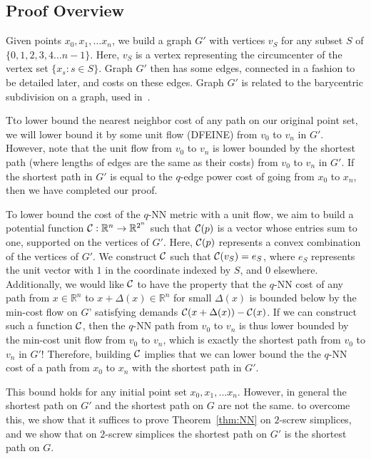 \subsection{Proof Overview}

Given points $x_0, x_1, \ldots x_n$, we build a graph $G'$ with
vertices $v_S$ for any subset $S$ of
$\{0,1,2,3,4 \ldots n-1 \}$. Here, $v_S$ is a vertex representing the
circumcenter of the vertex set $\{x_s: s \in S\}$. Graph $G'$ then has some
edges, connected in a fashion to be detailed later, and costs on these edges.
Graph $G'$ is related to the barycentric subdivision on a graph, used
in~\cite{}.

Tto lower bound the nearest neighbor cost of any path on our original point
set, we will lower bound it by some unit flow (DFEINE) from $v_0$ to $v_n$
in $G'$. However, note that the unit flow from $v_0$ to $v_n$ is lower
bounded by the shortest path (where lengths of edges are the same as their
costs) from $v_0$ to $v_n$ in $G'$. If the shortest path in $G'$ is equal
to the $q$-edge power cost of going from $x_0$ to $x_n$, then we have
completed our proof.

To lower bound the cost of the $q$-NN metric with a unit flow, we aim to build
a potential function $\mathcal{C}:\mathbb{R}^n \rightarrow \mathbb{R}^{2^n}$ such
that $\mathcal{C}(p)$ is a vector whose entries sum to one, supported on the
vertices of $G'$. Here, $\mathcal{C}(p)$
represents a convex combination of the vertices of $G'$. We construct $\mathcal{C}$
such that $\mathcal{C}(v_S) = e_S$, where $e_S$ represents the unit vector with $1$
in the coordinate indexed by $S$, and $0$ elsewhere. Additionally, we would
like $\mathcal{C}$ to have
the property that the $q$-NN cost of any path from $x \in \mathbb{R}^n$ to
$x+\Delta(x) \in \mathbb{R}^n$ for small $\Delta(x)$ is
bounded below by the min-cost flow on $G’$ satisfying demands
$\mathcal{C}(x+\Delta(x)) - \mathcal{C}(x)$. If we can construct such a function $\mathcal{C}$,
then the $q$-NN path from $v_0$ to $v_n$ is thus lower bounded by the min-cost
unit flow from $v_0$ to $v_n$, which is exactly the shortest path from
$v_0$ to $v_n$ in $G'$!
 Therefore, building $\mathcal{C}$ implies that we can lower bound the
the $q$-NN cost of a path from $x_0$ to $x_n$ with the shortest path in $G'$.

This bound holds for any initial point set $x_0, x_1, \ldots x_n$. However,
in general the shortest path on $G'$ and the shortest path on $G$ are not
the same. to overcome this, we show that it suffices to prove
Theorem~\ref{thm:NN} on $2$-screw simplices, and we show that on $2$-screw
simplices the shortest path on $G'$ is the shortest path on $G$.

